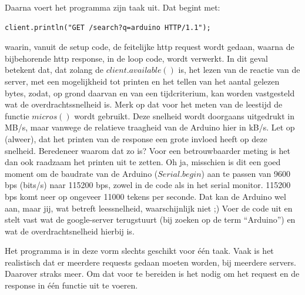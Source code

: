 Daarna voert het programma zijn taak uit. Dat begint met:
\begin{lstlisting}[language=Arduino, numbers=none]
client.println("GET /search?q=arduino HTTP/1.1");
\end{lstlisting}

waarin, vanuit de setup code, de feitelijke http request wordt gedaan, waarna de bijbehorende http response, in de loop code, wordt verwerkt. In dit geval betekent dat, dat zolang de $client.available()$ is, het lezen van de reactie van de server, met een mogelijkheid tot printen en het tellen van het aantal gelezen bytes, zodat, op grond daarvan en van een tijdcriterium, kan worden vastgesteld wat de overdrachtssnelheid is. Merk op dat voor het meten van de leestijd de functie $micros()$ wordt gebruikt. Deze snelheid wordt doorgaans uitgedrukt in MB/s, maar vanwege de relatieve traagheid van de Arduino hier in kB/s. Let op (alweer), dat het printen van de response een grote invloed heeft op deze snelheid. Beredeneer waarom dat zo is? Voor een betrouwbaarder meting is het dan ook raadzaam het printen uit te zetten.
Oh ja, misschien is dit een goed moment om de baudrate van de Arduino ($Serial.begin$) aan te passen van 9600 bps (bits/s) naar 115200 bps, zowel in de code als in het serial monitor. 115200 bps komt neer op ongeveer 11000 tekens per seconde. Dat kan de Arduino wel aan, maar jij, wat betreft leessnelheid, waarschijnlijk niet ;)
Voer de code uit en stelt vast wat de google-server terugstuurt (bij zoeken op de term “Arduino”) en wat de overdrachtsnelheid hierbij is. \newline \newline

Het programma is in deze vorm slechts geschikt voor één taak. Vaak is het realistisch dat er meerdere requests gedaan moeten worden, bij meerdere servers. Daarover straks meer. Om dat voor te bereiden is het nodig om het request en de response in één functie uit te voeren.

